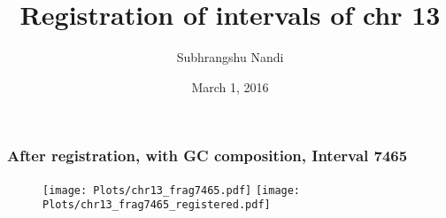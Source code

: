 \documentclass[10pt,dvipsnames,table]{beamer}
\title[mm52Chr13]{Registration of intervals of chr 13}
\author{Subhrangshu Nandi}
\institute[Prelim exam]{Preliminary Exam \\
Department of Statistics \\
University of Wisconsin-Madison}
\date{March 1, 2016}
\begin{document}
\setlength{\baselineskip}{16truept}


\begin{frame}
\frametitle{After registration, with GC composition, Interval 7465}
\begin{figure}[t]
\texttt{[image: Plots/chr13\_frag7465.pdf]}
\texttt{[image: Plots/chr13\_frag7465\_registered.pdf]}
\end{figure}
\end{frame}
\end{document}
